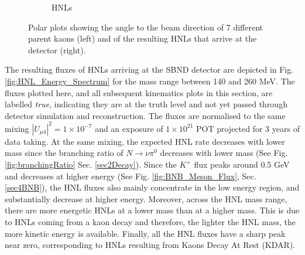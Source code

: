 \begin{figure}[htbp!]
\begin{subfigure}[b]{0.495\textwidth}
            \caption{HNLs}%
            \label{fig:hnl_angle2beam}
        \end{subfigure}
        \caption[Angle To The Beam Direction of Kaons and Resulting HNLs Polar Plots]{
	Polar plots showing the angle to the beam direction of 7 different parent kaons (left) and of the resulting HNLs that arrive at the detector (right).
	}
        \label{fig:kaon_hnl_angle2beam}
\end{figure}

The resulting fluxes of HNLs arriving at the SBND detector are depicted in Fig. \ref{fig:HNL_Energy_Spectrum} for the mass range between 140 and 260 MeV.
The fluxes plotted here, and all subsequent kinematics plots in this section, are labelled \textit{true}, indicating they are at the truth level and not yet passed through detector simulation and reconstruction.
The fluxes are normalised to the same mixing $|U_{\mu4}|^{2} = 1 \times 10^{-7}$ and an exposure of $1 \times 10^{21}$ POT projected for 3 years of data taking.
At the same mixing, the expected HNL rate decreases with lower mass since the branching ratio of $N \rightarrow \nu\pi^0$ decreases with lower mass (See Fig. \ref{fig:branchingRatio} Sec. \ref{sec2Decay}).
Since the $K^{+}$ flux peaks around 0.5 GeV and decreases at higher energy (See Fig. \ref{fig:BNB_Meson_Flux}, Sec. \ref{sec4BNB}), the HNL fluxes also mainly concentrate in the low energy region, and substantially decrease at higher energy. 
Moreover, across the HNL mass range, there are more energetic HNLs at a lower mass than at a higher mass.
This is due to HNLs coming from a kaon decay and therefore, the lighter the HNL mass, the more kinetic energy is available.
Finally, all the HNL fluxes have a sharp peak near zero, corresponding to HNLs resulting from Kaons Decay At Rest (KDAR).

